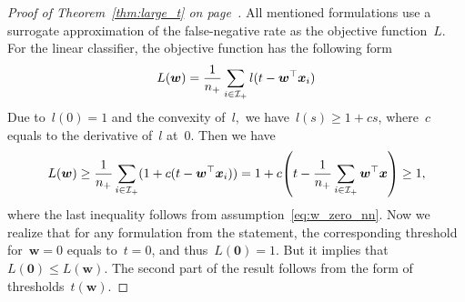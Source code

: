 \pagebreak

\larget*
\begin{proof}[Proof of Theorem~\ref{thm:large_t} on page~\pageref{thm:large_t}]
  All mentioned formulations use a surrogate approximation of the false-negative rate as the objective function~$L.$ For the linear classifier, the objective function has the following form
  \begin{equation*}
    L(\bm{w})
      = \frac{1}{n_{+}}\sum_{i \in \mathcal{I}_{+}}l(t - \bm{w}^{\top} \bm{x}_i)
  \end{equation*}
  Due to~$l(0) = 1$ and the convexity of~$l,$ we have~$l(s) \geq 1 + cs$, where~$c$ equals to the derivative of~$l$ at~$0$. Then we have
  \begin{equation*}
    L(\bm{w}) 
      \geq \frac{1}{\npos} \sum_{i \in \Ipos}(1 + c(t-\bm{w}^{\top} \bm{x}_i))
      = 1 + c\Brac{t - \frac{1}{\npos}\sum_{i \in \Ipos}\bm{w}^{\top} \bm{x}}
      \geq 1,
  \end{equation*}
  where the last inequality follows from assumption~\eqref{eq:w_zero_nn}. Now we realize that for any formulation from the statement, the corresponding threshold for~$\bm{w}=0$ equals to~$t=0$, and thus~$L(\bm{0})=1$. But it implies that~$L(\bm{0}) \leq L(\bm{w})$. The second part of the result follows from the form of thresholds~$t(\bm{w})$.
\end{proof}

